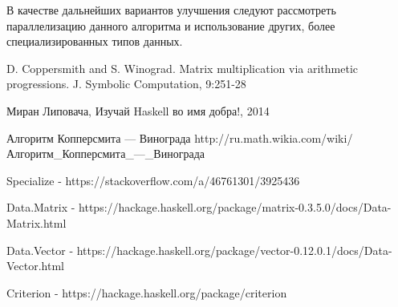 \documentclass[a4paper,12pt,russian]{article}
\begin{document}
	В качестве дальнейших вариантов улучшения следуют рассмотреть параллелизацию данного алгоритма и использование других, более специализированных типов данных.
	
	

	\begin{thebibliography}{9}
		
		D. Coppersmith and S. Winograd. Matrix multiplication via
		arithmetic progressions. J. Symbolic Computation, 9:251-28
		
		Миран Липовача, Изучай Haskell во имя добра!, 2014
		
		Алгоритм Копперсмита — Винограда http://ru.math.wikia.com/wiki/Алгоритм\_Копперсмита\_—\_Винограда
		
		Specialize - https://stackoverflow.com/a/46761301/3925436
		
		Data.Matrix - https://hackage.haskell.org/package/matrix-0.3.5.0/docs/Data-Matrix.html
		
		Data.Vector - https://hackage.haskell.org/package/vector-0.12.0.1/docs/Data-Vector.html
		
		Criterion - https://hackage.haskell.org/package/criterion
		
		
	\end{thebibliography}
	
\end{document}
